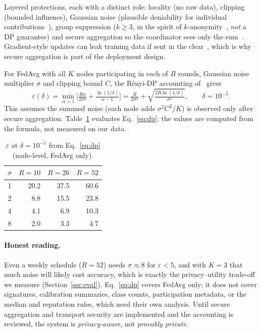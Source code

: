 \documentclass[11pt,a4paper]{article}
\newcommand{\hdr}{\rowcolor{emblue!15}}
\begin{document}
Layered protections, each with a distinct role: locality (no raw data), clipping (bounded influence), Gaussian noise (plausible deniability for individual contributions~\cite{dwork2014,abadi2016}), group suppression ($k\!\ge\!3$, in the spirit of $k$-anonymity~\cite{sweeney2002}, \emph{not} a DP guarantee) and secure aggregation so the coordinator sees only the sum~\cite{bonawitz2017}. Gradient-style updates can leak training data if sent in the clear~\cite{zhu2019}, which is why secure aggregation is part of the deployment design.

For FedAvg with all $K$ nodes participating in each of $R$ rounds, Gaussian noise multiplier $\sigma$ and clipping bound $C$, the R\'enyi-DP accounting of~\cite{mironov2017} gives
\begin{equation}
 \varepsilon(\delta)=\min_{\alpha>1}\Big[\tfrac{R\alpha}{2\sigma^2}+\tfrac{\ln(1/\delta)}{\alpha-1}\Big]
 =\tfrac{R}{2\sigma^2}+\sqrt{\tfrac{2R\ln(1/\delta)}{\sigma^2}},\qquad\delta=10^{-5}.
 \label{eq:dp}
\end{equation}
This assumes the summed noise (each node adds $\sigma^2C^2/K$) is observed only after secure aggregation. Table~\ref{tab:eps} evaluates Eq.~\eqref{eq:dp}; the values are computed from the formula, not measured on our data.

\begin{table}[H]
\centering\small
\caption{$\varepsilon$ at $\delta=10^{-5}$ from Eq.~\eqref{eq:dp} (node-level, FedAvg only).}
\label{tab:eps}
\begin{tabular}{@{}c rrr@{}}
\toprule\hdr
$\sigma$ & $R=10$ & $R=26$ & $R=52$ \\
\midrule
1 & 20.2 & 37.5 & 60.6 \\
2 & 8.8 & 15.5 & 23.8 \\
4 & 4.1 & 6.9 & 10.3 \\
8 & 2.0 & 3.3 & 4.7 \\
\bottomrule
\end{tabular}
\end{table}

\paragraph{Honest reading.} Even a weekly schedule ($R=52$) needs $\sigma\!\approx\!8$ for $\varepsilon<5$, and with $K=3$ that much noise will likely cost accuracy, which is exactly the privacy--utility trade-off we measure (Section~\ref{sec:eval}). Eq.~\eqref{eq:dp} covers FedAvg only; it does not cover signatures, calibration summaries, class counts, participation metadata, or the median and reputation rules, which need their own analysis. Until secure aggregation and transport security are implemented and the accounting is reviewed, the system is \emph{privacy-aware}, not \emph{provably private}.
\end{document}
